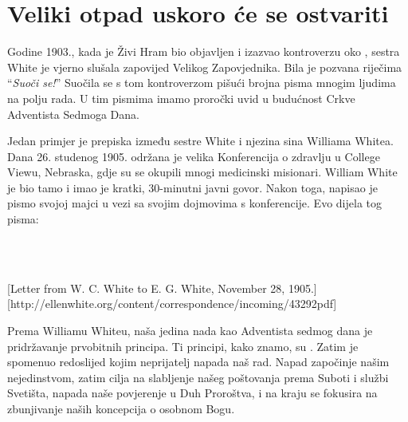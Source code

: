 \chapter{Veliki otpad uskoro će se ostvariti} \label{chap:apostasy}

Godine 1903., kada je Živi Hram bio objavljen i izazvao kontroverzu oko , sestra White je vjerno slušala zapovijed Velikog Zapovjednika. Bila je pozvana riječima “\textit{Suoči se!}” Suočila se s tom kontroverzom pišući brojna pisma mnogim ljudima na polju rada. U tim pismima imamo proročki uvid u budućnost Crkve Adventista Sedmoga Dana.

Jedan primjer je prepiska između sestre White i njezina sina Williama Whitea. Dana 26. studenog 1905. održana je velika Konferencija o zdravlju u College Viewu, Nebraska, gdje su se okupili mnogi medicinski misionari. William White je bio tamo i imao je kratki, 30-minutni javni govor. Nakon toga, napisao je pismo svojoj majci u vezi sa svojim dojmovima s konferencije. Evo dijela tog pisma:

 \\
 \\

[Letter from W. C. White to E. G. White, November 28, 1905.][http://ellenwhite.org/content/correspondence/incoming/43292pdf]

Prema Williamu Whiteu, naša jedina nada kao Adventista sedmog dana je pridržavanje prvobitnih principa. Ti principi, kako znamo, su . Zatim je spomenuo redoslijed kojim neprijatelj napada naš rad. Napad započinje našim nejedinstvom, zatim cilja na slabljenje našeg poštovanja prema Suboti i službi Svetišta, napada naše povjerenje u Duh Proroštva, i na kraju se fokusira na zbunjivanje naših koncepcija o osobnom Bogu.

